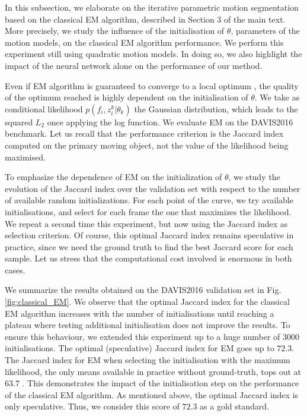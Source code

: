 \documentclass[10pt,twocolumn,letterpaper]{article}
\begin{document}
In this subsection, we elaborate on the iterative parametric motion segmentation based on the classical EM algorithm, described in Section 3 of the main text. More precisely, we study the influence of the initialisation of $\theta$, parameters of the motion models, on the classical EM algorithm performance. We perform this experiment still using quadratic motion models. In doing so, we also highlight the impact of the neural network alone on the performance of our method.




Even if EM algorithm is guaranteed to converge to a local optimum \cite{murphy_book2012}, the quality of the optimum reached is highly dependent on the initialisation of $\theta$. We take as conditional likelihood $p(f_i, z_i^k | \theta_k)$ the Gaussian distribution, which leads to the squared $L_2$ once applying the log function. We evaluate EM on the DAVIS2016 benchmark. Let us recall that the performance criterion is the Jaccard index computed on the primary moving object, not the value of the likelihood being maximised.

To emphasize the dependence of EM on the initialization of $\theta$, we study the evolution of the Jaccard index over the validation set with respect to the number of available random initializations. For each point of the curve, we try available initialisations, and select for each frame the one that maximizes the likelihood. We repeat a second time this experiment, but now using the Jaccard index as selection criterion. Of course, this optimal Jaccard index remains speculative in practice, since we need the ground truth to find the best Jaccard score for each sample. Let us stress that the computational cost involved is enormous in both cases.

We summarize the results obtained on the DAVIS2016 validation set in Fig.\ref{fig:classical_EM}. We observe that the optimal Jaccard index for the classical EM algorithm increases with the number of initialisations until reaching a plateau where testing additional initialisation does not improve the results. To ensure this behaviour, we extended this experiment up to a huge number of 3000 initialisations. 
The optimal (speculative) Jaccard index for EM goes up to $72.3$. The Jaccard index for EM when selecting the initialisation with the maximum likelihood, the only means available in practice without ground-truth, tops out at $63.7$ .
This demonstrates the impact of the initialisation step on the performance of the classical EM algorithm. As mentioned above, the optimal Jaccard index is only speculative. Thus, we consider this score of $72.3$ as a gold standard.
\end{document}
